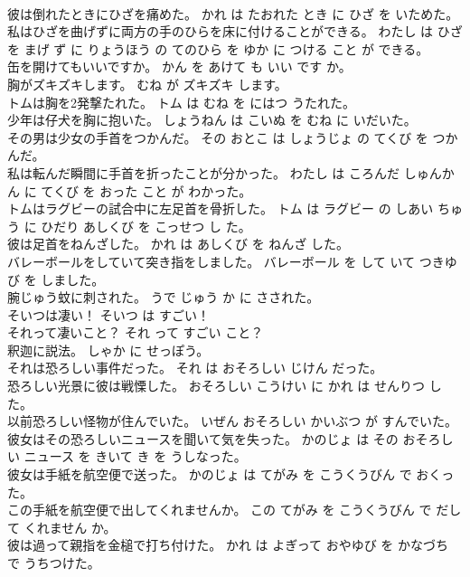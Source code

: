 \documentclass[8pt]{extreport}
\begin{document}
\begin{CJK}{UTF8}{min}
\\	彼は倒れたときにひざを痛めた。	かれ は たおれた とき に ひざ を いためた。	
\\	私はひざを曲げずに両方の手のひらを床に付けることができる。	わたし は ひざ を まげ ず に りょうほう の てのひら を ゆか に つける こと が できる。	
\\	缶を開けてもいいですか。	かん を あけて も いい です か。	
\\	胸がズキズキします。	むね が ズキズキ します。	
\\	トムは胸を2発撃たれた。	トム は むね を にはつ うたれた。	
\\	少年は仔犬を胸に抱いた。	しょうねん は こいぬ を むね に いだいた。	
\\	その男は少女の手首をつかんだ。	その おとこ は しょうじょ の てくび を つかんだ。	
\\	私は転んだ瞬間に手首を折ったことが分かった。	わたし は ころんだ しゅんかん に てくび を おった こと が わかった。	
\\	トムはラグビーの試合中に左足首を骨折した。	トム は ラグビー の しあい ちゅう に ひだり あしくび を こっせつ し た。	
\\	彼は足首をねんざした。	かれ は あしくび を ねんざ した。	
\\	バレーボールをしていて突き指をしました。	バレーボール を して いて つきゆび を しました。	
\\	腕じゅう蚊に刺された。	うで じゅう か に さされた。	
\\	そいつは凄い！	そいつ は すごい！	
\\	それって凄いこと？	それ って すごい こと？	
\\	釈迦に説法。	しゃか に せっぽう。	
\\	それは恐ろしい事件だった。	それ は おそろしい じけん だった。	
\\	恐ろしい光景に彼は戦慄した。	おそろしい こうけい に かれ は せんりつ した。	
\\	以前恐ろしい怪物が住んでいた。	いぜん おそろしい かいぶつ が すんでいた。	
\\	彼女はその恐ろしいニュースを聞いて気を失った。	かのじょ は その おそろしい ニュース を きいて き を うしなった。	
\\	彼女は手紙を航空便で送った。	かのじょ は てがみ を こうくうびん で おくった。	
\\	この手紙を航空便で出してくれませんか。	この てがみ を こうくうびん で だして くれません か。	
\\	彼は過って親指を金槌で打ち付けた。	かれ は よぎって おやゆび を かなづち で うちつけた。	

\end{CJK}
\end{document}
